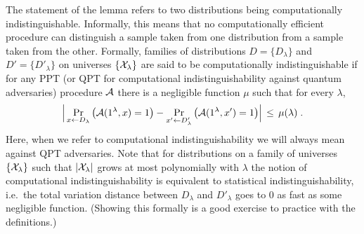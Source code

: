\begin{remark}\label{rk:comp-dist}
The statement of the lemma refers to two distributions being computationally indistinguishable. Informally, this means that no computationally efficient procedure can distinguish a sample taken from one distribution from a sample taken from the other. Formally, families of distributions $D = \{D_\lambda\}$ and $D' = \{D'_\lambda\}$ on universes $\{\mathcal{X}_\lambda\}$ are said to be  computationally indistinguishable if for any PPT (or QPT for computational indistinguishability against quantum adversaries) procedure $\mathcal{A}$ there is a negligible function $\mu$ such that for every $\lambda$,
\[ \Big|\Pr_{x\leftarrow D_\lambda}\big( \mathcal{A}(1^\lambda,x)=1\big) - \Pr_{x' \leftarrow D'_\lambda}\big(\mathcal{A}(1^\lambda,x')=1\big)\Big|\,\leq\, \mu(\lambda)\;.\]
Here, when we refer to computational indistinguishability we will always mean against QPT adversaries. Note that for distributions on a family of universes $\{\mathcal{X}_\lambda\}$ such that $|\mathcal{X}_\lambda|$ grows at most polynomially with $\lambda$ the notion of computational indistinguishability is equivalent to statistical indistinguishability, i.e.\ the total variation distance between $D_\lambda$ and $D'_\lambda$ goes to $0$ as fast as some negligible function. (Showing this formally is a good exercise to practice with the definitions.)
\end{remark}



